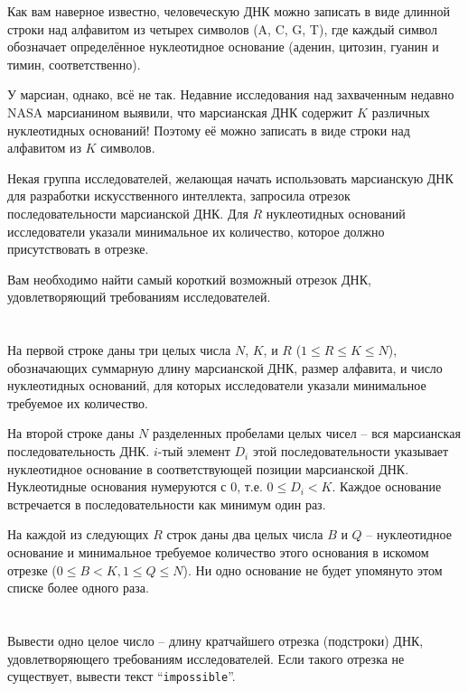\ifx\boi\undefined\fi
\def\version{jury-1}
Как вам наверное известно, человеческую ДНК можно записать в виде длинной строки над алфавитом из четырех символов ({A, C, G, T}), 
где каждый символ обозначает определённое нуклеотидное основание (аденин, цитозин, гуанин и тимин, соответственно).

У марсиан, однако, всё не так. Недавние исследования над захваченным недавно NASA марсианином выявили, что
марсианская ДНК содержит $K$ различных нуклеотидных оснований! Поэтому её можно записать в виде строки над алфавитом из $K$ символов.

Некая группа исследователей, желающая начать использовать марсианскую ДНК для разработки искусственного интеллекта,
запросила отрезок последовательности марсианской ДНК. Для $R$ нуклеотидных оснований исследователи указали минимальное их количество,
которое должно присутствовать в отрезке.

Вам необходимо найти самый короткий возможный отрезок ДНК, удовлетворяющий требованиям исследователей.

\section*{}
На первой строке даны три целых числа $N$, $K$, и $R$ ($1 \le R \le K \le N$), обозначающих суммарную длину марсианской ДНК, размер алфавита, и число нуклеотидных оснований,
для которых исследователи указали минимальное требуемое их количество.

На второй строке даны $N$ разделенных пробелами целых чисел -- вся марсианская последовательность ДНК. $i$-тый элемент $D_i$ этой последовательности  указывает нуклеотидное основание в соответствующей позиции марсианской ДНК.
Нуклеотидные основания нумеруются с $0$, т.е. $0 \leq D_i < K$. Каждое основание встречается в последовательности как минимум один раз.

На каждой из следующих $R$ строк даны два целых числа $B$ и $Q$ -- нуклеотидное основание и минимальное требуемое количество этого основания в искомом отрезке ($0 \le B < K, 1 \le Q \le N$).
Ни одно основание не будет упомянуто этом списке более одного раза.

\section*{\outputsection}
Вывести одно целое число -- длину кратчайшего отрезка (подстроки) ДНК, удовлетворяющего требованиям исследователей. Если такого отрезка не существует, вывести текст ``\texttt{impossible}''.

